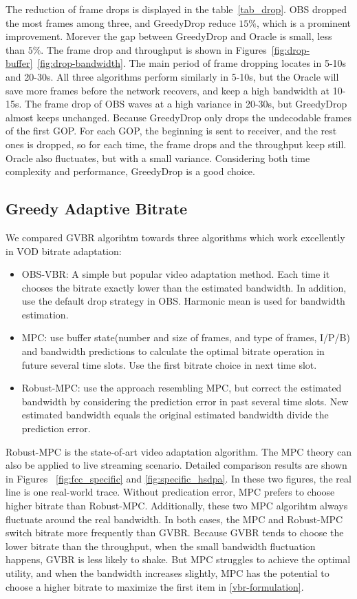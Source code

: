 

The reduction of frame drops is displayed in the table~\ref{tab_drop}. OBS dropped the most frames among three, and GreedyDrop reduce $15\%$, which is a prominent improvement. Morever the gap between GreedyDrop and Oracle is small, less than $5\%$. The frame drop and throughput is shown in Figures~\ref{fig:drop-buffer}~\ref{fig:drop-bandwidth}. The main period of frame dropping locates in 5-10s and 20-30s. All three algorithms perform similarly in 5-10s, but the Oracle will save more frames before the network recovers, and keep a high bandwidth at 10-15s. The frame drop of OBS waves at a high variance in 20-30s, but GreedyDrop almost keeps unchanged. Because GreedyDrop only drops the undecodable frames of the first GOP. For each GOP, the beginning is sent to receiver, and the rest ones is dropped, so for each time, the frame drops and the throughput keep still. Oracle also fluctuates, but with a small variance. Considering both time complexity and performance, GreedyDrop is a good choice.


\subsection{Greedy Adaptive Bitrate}

We compared GVBR algorihtm towards three algorithms which work excellently in VOD bitrate adaptation:
\begin{itemize}
  \item OBS-VBR: A simple but popular video adaptation method. Each time it chooses the bitrate exactly lower than the estimated bandwidth. In addition, use the default drop strategy in OBS. Harmonic mean is used for bandwidth estimation.
  \item MPC: use buffer state(number and size of frames, and type of frames, I/P/B) and bandwidth predictions to calculate the optimal bitrate operation in future several time slots. Use the first bitrate choice in next time slot.
  \item Robust-MPC: use the approach resembling MPC, but correct the estimated bandwidth by considering the prediction error in past several time slots. New estimated bandwidth equals the original estimated bandwidth divide the prediction error.
\end{itemize}
Robust-MPC is the state-of-art video adaptation algorithm. The MPC theory can also be applied to live streaming scenario.
Detailed comparison results are shown in Figures ~\ref{fig:fcc_specific} and \ref{fig:specific_hsdpa}. In these two figures, the real line is one real-world trace. Without predication error, MPC prefers to choose higher bitrate than Robust-MPC. Additionally, these two MPC algorihtm always fluctuate around the real bandwidth. In both cases, the MPC and Robust-MPC switch bitrate more frequently than GVBR. Because GVBR tends to choose the lower bitrate than the throughput, when the small bandwidth fluctuation happens, GVBR is less likely to shake. But MPC struggles to achieve the optimal utility, and when the bandwidth increases slightly, MPC has the potential to choose a higher bitrate to maximize the first item in \ref{vbr-formulation}.

